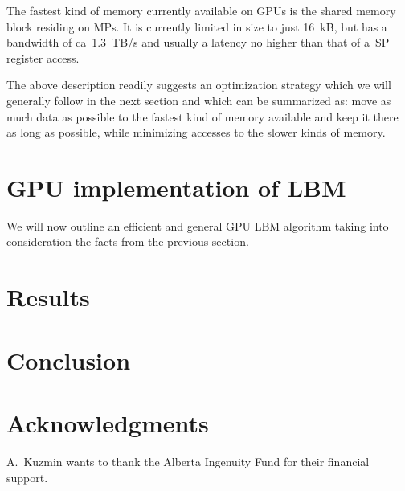 \documentclass[mathpazo,sort,numbers]{cicp}
\begin{document}
The fastest kind of memory currently available on GPUs is the shared memory block residing
on MPs.  It is currently limited in size to just 16~kB, but has a bandwidth of ca~1.3~TB/s
and usually a latency no higher than that of a~SP register access.

The above description readily suggests an optimization strategy which we will generally
follow in the next section and which can be summarized as: move as much data as possible
to the fastest kind of memory available and keep it there as long as possible, while minimizing
accesses to the slower kinds of memory.

\section{GPU implementation of LBM}

We will now outline an efficient and general GPU LBM algorithm taking into consideration
the facts from the previous section.

\section{Results}
\label{sec:benchmark}

\section{Conclusion}
\section*{Acknowledgments}
A.~Kuzmin wants to thank the Alberta Ingenuity Fund for their financial support.




\end{document}
